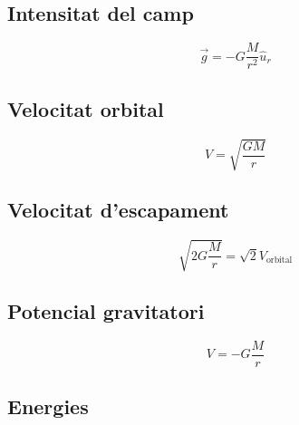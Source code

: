 \begin{multicols}{2}

    \subsection{Intensitat del camp}
    \label{sub:intensitat_del_camp}

    \begin{equation}
        \vec{g} = -G \frac{M}{r^2} \hat{u}_r
    \end{equation}

    \subsection{Velocitat orbital}
    \label{sub:velocitat_orbital}

    \begin{equation}
        V = \sqrt{\frac{GM}{r}}
    \end{equation}

    \subsection{Velocitat d'escapament}
    \label{sub:velocitat_d_escapament}

    \begin{equation}
        \sqrt{2G\frac{M}{r}} = \sqrt{2}V_\text{orbital}
    \end{equation}

    \subsection{Potencial gravitatori}
    \label{sub:potencial_gravitatori}
    
    \begin{equation}
        V = -G \frac{M}{r}
    \end{equation}

\end{multicols}

\subsection{Energies}
\label{sub:energies}

